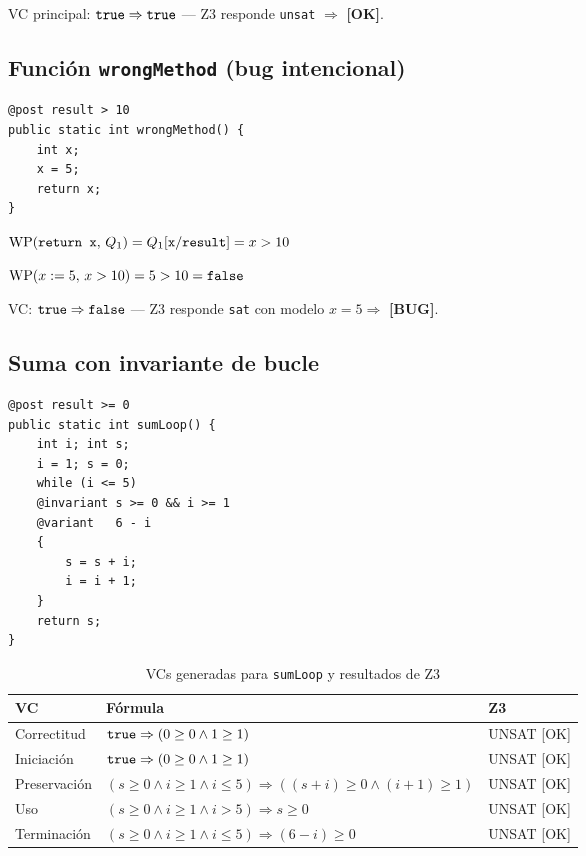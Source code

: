 VC principal: $\mathtt{true} \Rightarrow \mathtt{true}$ — Z3 responde \texttt{unsat} $\Rightarrow$ \textbf{[OK]}.

\subsection{Función \texttt{wrongMethod} (bug intencional)}

\begin{lstlisting}[style=java, caption={Método con bug intencional}]
@post result > 10
public static int wrongMethod() {
    int x;
    x = 5;
    return x;
}
\end{lstlisting}

$\mathrm{WP}(\texttt{return x},\,Q_1) = Q_1[\texttt{x}/\texttt{result}] = x > 10$

$\mathrm{WP}(x := 5,\,x > 10) = 5 > 10 = \mathtt{false}$

VC: $\mathtt{true} \Rightarrow \mathtt{false}$ — Z3 responde \texttt{sat} con modelo $x=5 \Rightarrow$ \textbf{[BUG]}.

\subsection{Suma con invariante de bucle}

\begin{lstlisting}[style=java, caption={Suma 1..5 con invariante completo}]
@post result >= 0
public static int sumLoop() {
    int i; int s;
    i = 1; s = 0;
    while (i <= 5)
    @invariant s >= 0 && i >= 1
    @variant   6 - i
    {
        s = s + i;
        i = i + 1;
    }
    return s;
}
\end{lstlisting}

\begin{table}[H]
  \centering
  \caption{VCs generadas para \texttt{sumLoop} y resultados de Z3}
  \label{tab:sumloop-vcs}
  \begin{tabular}{lp{7.5cm}l}
    \toprule
    \textbf{VC} & \textbf{Fórmula} & \textbf{Z3} \\
    \midrule
    Correctitud &
      $\mathtt{true} \Rightarrow (0\geq 0 \wedge 1\geq 1)$ &
      UNSAT \textcolor{green!60!black}{[OK]} \\
    Iniciación &
      $\mathtt{true} \Rightarrow (0\geq 0 \wedge 1\geq 1)$ &
      UNSAT \textcolor{green!60!black}{[OK]} \\
    Preservación &
      $(s\geq 0 \wedge i\geq 1 \wedge i\leq 5) \Rightarrow ((s+i)\geq 0 \wedge (i+1)\geq 1)$ &
      UNSAT \textcolor{green!60!black}{[OK]} \\
    Uso &
      $(s\geq 0 \wedge i\geq 1 \wedge i>5) \Rightarrow s\geq 0$ &
      UNSAT \textcolor{green!60!black}{[OK]} \\
    Terminación &
      $(s\geq 0 \wedge i\geq 1 \wedge i\leq 5) \Rightarrow (6-i)\geq 0$ &
      UNSAT \textcolor{green!60!black}{[OK]} \\
    \bottomrule
  \end{tabular}
\end{table}

